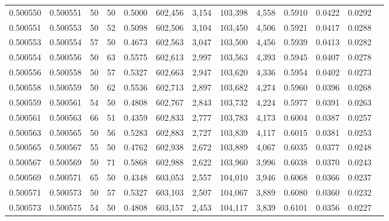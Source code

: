 \begin{tabular}{rrrrrrrrrrrrr}
0.500550 & 0.500551 &    50 &  50 &                                     0.5000 & 602,456 &   3,154 & 103,398 &   4,558 & 0.5910 & 0.0422 & 0.0292 \\
0.500551 & 0.500553 &    50 &  52 &                                     0.5098 & 602,506 &   3,104 & 103,450 &   4,506 & 0.5921 & 0.0417 & 0.0288 \\
0.500553 & 0.500554 &    57 &  50 &                                     0.4673 & 602,563 &   3,047 & 103,500 &   4,456 & 0.5939 & 0.0413 & 0.0282 \\
0.500554 & 0.500556 &    50 &  63 &                                     0.5575 & 602,613 &   2,997 & 103,563 &   4,393 & 0.5945 & 0.0407 & 0.0278 \\
0.500556 & 0.500558 &    50 &  57 &                                     0.5327 & 602,663 &   2,947 & 103,620 &   4,336 & 0.5954 & 0.0402 & 0.0273 \\
0.500558 & 0.500559 &    50 &  62 &                                     0.5536 & 602,713 &   2,897 & 103,682 &   4,274 & 0.5960 & 0.0396 & 0.0268 \\
0.500559 & 0.500561 &    54 &  50 &                                     0.4808 & 602,767 &   2,843 & 103,732 &   4,224 & 0.5977 & 0.0391 & 0.0263 \\
0.500561 & 0.500563 &    66 &  51 &                                     0.4359 & 602,833 &   2,777 & 103,783 &   4,173 & 0.6004 & 0.0387 & 0.0257 \\
0.500563 & 0.500565 &    50 &  56 &                                     0.5283 & 602,883 &   2,727 & 103,839 &   4,117 & 0.6015 & 0.0381 & 0.0253 \\
0.500565 & 0.500567 &    55 &  50 &                                     0.4762 & 602,938 &   2,672 & 103,889 &   4,067 & 0.6035 & 0.0377 & 0.0248 \\
0.500567 & 0.500569 &    50 &  71 &                                     0.5868 & 602,988 &   2,622 & 103,960 &   3,996 & 0.6038 & 0.0370 & 0.0243 \\
0.500569 & 0.500571 &    65 &  50 &                                     0.4348 & 603,053 &   2,557 & 104,010 &   3,946 & 0.6068 & 0.0366 & 0.0237 \\
0.500571 & 0.500573 &    50 &  57 &                                     0.5327 & 603,103 &   2,507 & 104,067 &   3,889 & 0.6080 & 0.0360 & 0.0232 \\
0.500573 & 0.500575 &    54 &  50 &                                     0.4808 & 603,157 &   2,453 & 104,117 &   3,839 & 0.6101 & 0.0356 & 0.0227 \\

\end{tabular}
